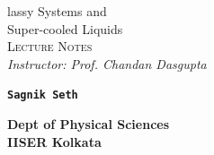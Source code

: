 \documentclass[usenames, svgnames, dvipsnames]{scrartcl}
\begin{document}
\makeatletter
\begin{titlepage}
    \vspace*{2cm}
    
        \begin{center}
            {\rmfamily
                \Huge{\textcolor{blue!30!black}{%
                    \textmd{{}}lassy {\HUGE S}ystems and \\
                     {\HUGE S}uper-cooled {\HUGE L}iquids%
                }}\\[0.7cm]
                
                
                \Large \textsc{Lecture Notes} \\[0.3cm]
               \Large \textit{Instructor: Prof. Chandan Dasgupta }\\[0.7cm]

            }
            \end{center}
       
        \begin{figure}[H]
            \centering
           
        \end{figure}
        \vspace{1cm}
        \begin{center}
           \Large \texttt{\textbf{{\LARGE  S}agnik {\LARGE S}eth }}
        \end{center}
        \vspace{0.5cm}
      \begin{center}
    \textbf{ Dept of Physical Sciences} \\
    \textbf{IISER Kolkata}
    \vspace{0.5cm}

   
\end{center}

\end{titlepage}
\end{document}
